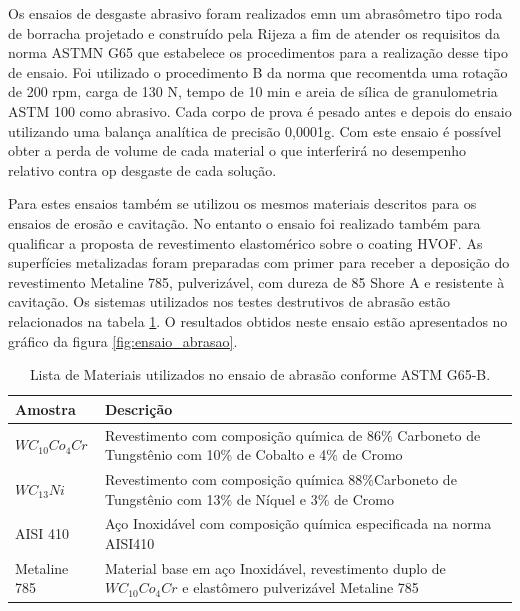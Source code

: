 Os ensaios de  desgaste abrasivo foram realizados emn um abrasômetro tipo roda
de borracha projetado e construído pela Rijeza a fim de atender os requisitos
da norma ASTMN G65 que estabelece os procedimentos para a realização desse tipo
de ensaio. Foi utilizado o procedimento B da norma que recomentda uma rotação
de 200 rpm, carga de 130 N, tempo de 10 min e areia de sílica de granulometria
ASTM 100 como abrasivo. Cada corpo de prova é pesado antes e depois do ensaio
utilizando uma balança analítica de precisão 0,0001g. Com este ensaio é
possível obter a perda de volume de cada material o que interferirá no
desempenho relativo contra op desgaste de cada solução.

Para estes ensaios também se utilizou os mesmos materiais descritos para os
ensaios de erosão e cavitação. No entanto o ensaio foi realizado também para
qualificar a proposta de revestimento elastomérico sobre o coating HVOF. As
superfícies metalizadas foram preparadas com primer para receber a deposição do
revestimento Metaline 785, pulverizável, com dureza de 85 Shore A e resistente
à cavitação. Os sistemas utilizados nos testes destrutivos de abrasão estão
relacionados na tabela \ref{tab:ensaio_abrasao}. O resultados obtidos neste
ensaio estão apresentados no gráfico da figura \ref{fig:ensaio_abrasao}.

\begin{table}[H]
\centering
\begin{tabular}{|l|p{8cm}|}
Amostra     & Descrição \\ \hline
$WC_{10}Co_{4}Cr$   & Revestimento com composição química de 86\% Carboneto de
Tungstênio com 10\% de Cobalto e 4\% de Cromo \\ \hline
$WC_{13}Ni$         & Revestimento com composição química 88\%Carboneto de
Tungstênio com 13\% de Níquel e 3\% de Cromo \\ \hline
AISI 410            & Aço Inoxidável com composição química especificada na
norma AISI410 \\ \hline
Metaline 785        & Material base em aço Inoxidável, revestimento duplo de
$WC_{10}Co_{4}Cr$ e elastômero pulverizável Metaline 785 \\ \hline
\end{tabular}
\caption{Lista de Materiais utilizados no ensaio de abrasão conforme ASTM
G65-B.}
\label{tab:ensaio_abrasao}
\end{table}


